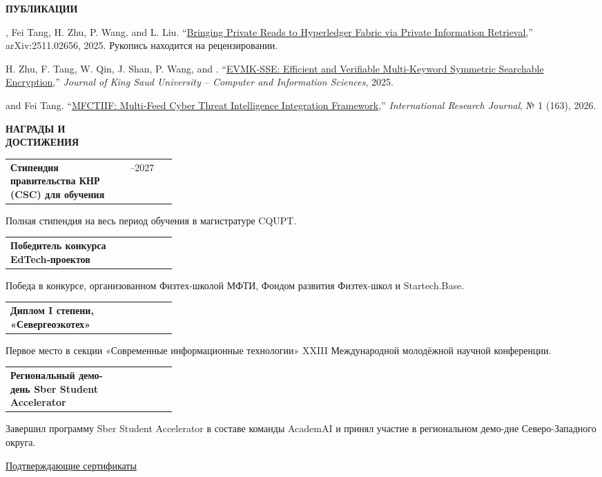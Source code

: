 \documentclass[11pt,a4paper]{article}
\makeatletter
\newcommand{\cvrow}[2]{%
  \noindent
  \begin{minipage}[t]{0.145\textwidth}
    \vspace{0pt}%
    \raggedright
    \fontsize{8.5}{10}\selectfont
    \bfseries\MakeUppercase{#1}
  \end{minipage}%
  \hfill
  \begin{minipage}[t]{0.835\textwidth}
    \vspace{0pt}%
    #2
  \end{minipage}\par
}
\newcommand{\entry}[2]{%
  \begin{tabularx}{\linewidth}{@{}X >{\raggedleft\arraybackslash}p{0.28\linewidth}@{}}
    #1 & #2
  \end{tabularx}
}
\newcommand{\pub}[2]{%
  #1 #2\par
  \vspace{0.28em}
}
\makeatother
\begin{document}
\vspace{0.75em}

\cvrow{Публикации}{%
  \pub{, Fei Tang, H. Zhu, P. Wang, and L. Liu.}
  {``\href{https://arxiv.org/abs/2511.02656}
  {Bringing Private Reads to Hyperledger Fabric via Private Information Retrieval},''
  arXiv:2511.02656, 2025. Рукопись находится на рецензировании.}

  \pub{H. Zhu, F. Tang, W. Qin, J. Shan, P. Wang, and \underbar{Artur Iasenovets}.}
  {``\href{https://doi.org/10.1007/s44443-025-00405-8}
  {EVMK-SSE: Efficient and Verifiable Multi-Keyword Symmetric Searchable Encryption},''
  \textit{Journal of King Saud University -- Computer and Information Sciences}, 2025.}

  \pub{\underbar{Artur Iasenovets} and Fei Tang.}
  {``\href{https://doi.org/10.60797/IRJ.2026.163.57}
  {MFCTIIF: Multi-Feed Cyber Threat Intelligence Integration Framework},''
  \textit{International Research Journal}, № 1 (163), 2026.}


}

\vspace{0.75em}

\cvrow{Награды и\\достижения}{%
  \entry
    {\textbf{Стипендия правительства КНР (CSC) для обучения}}
    {2024--2027}
  Полная стипендия на весь период обучения в магистратуре CQUPT.

  \vspace{0.45em}
  \entry
    {\textbf{Победитель конкурса EdTech-проектов}}
    {2023}
  Победа в конкурсе, организованном Физтех-школой МФТИ,
  Фондом развития Физтех-школ и Startech.Base.

  \vspace{0.45em}
  \entry
    {\textbf{Диплом I степени, «Севергеоэкотех»}}
    {2022}
  Первое место в секции «Современные информационные технологии»
  XXIII Международной молодёжной научной конференции.

  \vspace{0.45em}
  \entry
    {\textbf{Региональный демо-день Sber Student Accelerator}}
    {2023}
  Завершил программу Sber Student Accelerator в составе команды AcademAI
  и принял участие в региональном демо-дне Северо-Западного округа.

  \vspace{0.3em}
  \href{https://iasenovets.github.io/files/certificates_selected_en_public_ready_v2.pdf}
       {\small Подтверждающие сертификаты}
}
\end{document}
